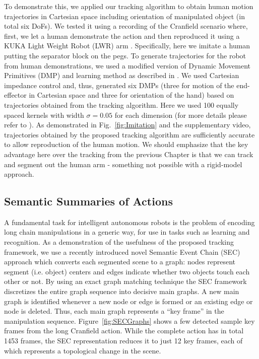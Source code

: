 To demonstrate this, we applied our tracking algorithm to obtain human motion trajectories in Cartesian space including orientation of manipulated object (in total six DoFs). We tested it using a recording of the Cranfield scenario where, first, we let a human demonstrate the action and then reproduced it using a KUKA Light Weight Robot (LWR) arm \cite{kuka}. Specifically, here we imitate a human putting the separator block on the pegs. To generate trajectories for the robot from human demonstrations, we used a modified version of Dynamic Movement Primitives \cite{Ijspeert2002,Ijspeert2013} (DMP) and learning method as described in \cite{Kulvicius2012}. We used Cartesian impedance control and, thus, generated six DMPs (three for motion of the end-effector in Cartesian space and three for orientation of the hand) based on trajectories obtained from the tracking algorithm. Here we used 100 equally spaced kernels with width $\sigma=0.05$ for each dimension (for more details please refer to \cite{Kulvicius2012}).
 As demonstrated in Fig.~\ref{fig:Imitation} and the supplementary video, trajectories obtained by the proposed tracking algorithm are sufficiently accurate to allow reproduction of the human motion. We should emphasize that the key advantage here over the tracking from the previous Chapter is that we can track and segment out the human arm - something not possible with a rigid-model approach.


\subsection{Semantic Summaries of Actions}
A fundamental task for intelligent autonomous robots is the problem of encoding long chain manipulations in a generic way, for use in tasks such as learning and recognition. As a demonstration of the usefulness of the proposed tracking framework, we use a recently introduced novel Semantic Event Chain (SEC) approach \cite{Aksoy11} which converts each segmented scene to a graph: nodes represent segment (i.e. object) centers and edges indicate whether two objects touch each other or not. By using an exact graph matching technique the SEC framework discretizes the entire graph sequence into decisive main graphs. A new main graph is identified whenever a new node or edge is formed or an existing edge or node is deleted. Thus, each main graph represents a “key frame” in the manipulation sequence. Figure~\ref{fig:SECGraphs} shows a few detected sample key frames from the long Cranfield action. While the complete action has in total 1453 frames, the SEC representation reduces it to just 12 key frames, each of which represents a topological change in the scene.

